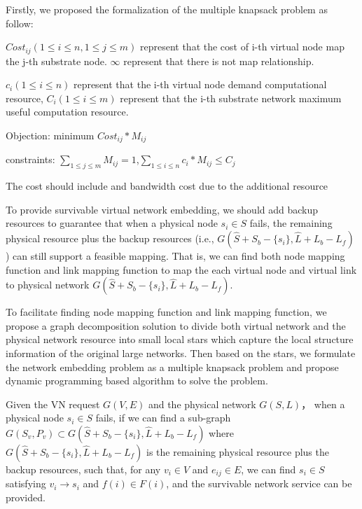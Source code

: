 Firstly, we proposed the formalization of the multiple knapsack problem as follow:



$Cost_{ij}(1\leq i\leq n,1 \leq j \leq m)$ represent that the cost of i-th virtual node map the j-th substrate node. $\infty$ represent that there is not map relationship.

$c_i(1\leq i\leq n)$ represent that the i-th virtual node demand computational resource, $C_i(1\leq i\leq m)$ represent that the i-th substrate network maximum useful computation resource.

Objection: minimum $Cost_{ij}*M_{ij}$

constraints: $\sum\limits_{1\leq j\leq m} M_{ij}=1$,$\sum\limits_{1\leq i\leq n} c_i*M_{ij}\leq C_j$



The cost should include and bandwidth cost due to the additional resource









To provide survivable virtual network embedding, we should add  backup resources to guarantee that when a physical node $ {s_i} \in S $ fails, the remaining physical resource plus the backup resources (i.e., $G\left( {\hat S + {S_b} - \{ {s_i}\} ,\hat L + {L_b} - {L_f}} \right)$) can still support a feasible mapping. That is, we can  find both node mapping function and link mapping function to map the each virtual node and virtual link  to physical network $G\left( {\hat S + {S_b} - \{ {s_i}\} ,\hat L + {L_b} - {L_f}} \right)$.

To facilitate finding  node mapping function and link mapping function, we propose a graph decomposition solution to divide both  virtual network and the physical network resource into small local stars  which capture the local structure information of the original large networks. Then based on the stars, we formulate the network embedding problem as a multiple knapsack problem and propose dynamic programming based algorithm to solve the problem.




\begin{theorem}
Given the VN request $G (V,E)$ and the physical network  $G (S,L)$， when a physical node $ {s_i} \in S $ fails, if we can find a sub-graph $G\left( {{S_v},{P_v}} \right) \subset G\left( {\hat S + {S_b} - \{ {s_i}\} ,\hat L + {L_b} - {L_f}} \right)$ where $G\left( {\hat S + {S_b} - \{ {s_i}\} ,\hat L + {L_b} - {L_f}} \right)$ is the remaining physical resource plus the backup resources, such that, for any ${v_i} \in V$ and ${e_{ij}} \in E$, we can find ${s_{i}} \in S$ satisfying ${v_i} \to {s_{i}}$ and $f(i)\in F(i)$, and    the survivable network service can be provided.
\label{fig:isomorphic}
\end{theorem}



